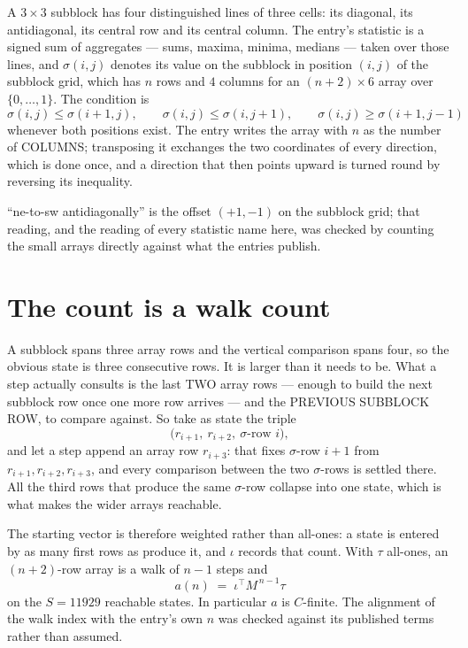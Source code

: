 \documentclass[11pt,a4paper]{article}
\theoremstyle{plain}
\theoremstyle{definition}
\begin{document}
A $3\times3$ subblock has four distinguished lines of three cells: its diagonal, its
antidiagonal, its central row and its central column. The entry's statistic is a signed sum of
aggregates --- sums, maxima, minima, medians --- taken over those lines, and $\sigma(i,j)$
denotes its value on the subblock in position $(i,j)$ of the subblock grid, which has $n$ rows
and $4$ columns for an $(n+2)\times6$ array over $\{0,\dots,1\}$. The condition is
\[
\sigma(i,j)\le\sigma(i+1,j),\qquad \sigma(i,j)\le\sigma(i,j+1),\qquad \sigma(i,j)\ge\sigma(i+1,j-1)
\]
whenever both positions exist. The entry writes the array with $n$ as the number of COLUMNS; transposing it exchanges the two coordinates of every direction, which is done once, and a direction that then points upward is turned round by reversing its inequality.

``ne-to-sw antidiagonally'' is the offset $(+1,-1)$ on the subblock grid; that reading, and
the reading of every statistic name here, was checked by counting the small arrays directly
against what the entries publish.

\section{The count is a walk count}

A subblock spans three array rows and the vertical comparison spans four, so the obvious state
is three consecutive rows. It is larger than it needs to be. What a step actually consults is
the last TWO array rows --- enough to build the next subblock row once one more row arrives ---
and the PREVIOUS SUBBLOCK ROW, to compare against. So take as state the triple
\[
\bigl(r_{i+1},\ r_{i+2},\ \sigma\text{-row }i\bigr),
\]
and let a step append an array row $r_{i+3}$: that fixes $\sigma$-row $i+1$ from
$r_{i+1},r_{i+2},r_{i+3}$, and every comparison between the two $\sigma$-rows is settled
there. All the third rows that produce the same $\sigma$-row collapse into one state, which is
what makes the wider arrays reachable.

The starting vector is therefore weighted rather than all-ones: a state is entered by as many
first rows as produce it, and $\iota$ records that count. With $\tau$ all-ones, an
$(n+2)$-row array is a walk of $n-1$ steps and
\[
a(n)\;=\;\iota^{\!\top}M^{\,n-1}\tau
\]
on the $S=11929$ reachable states. In particular $a$ is $C$-finite. The alignment of the walk
index with the entry's own $n$ was checked against its published terms rather than assumed.
\end{document}
